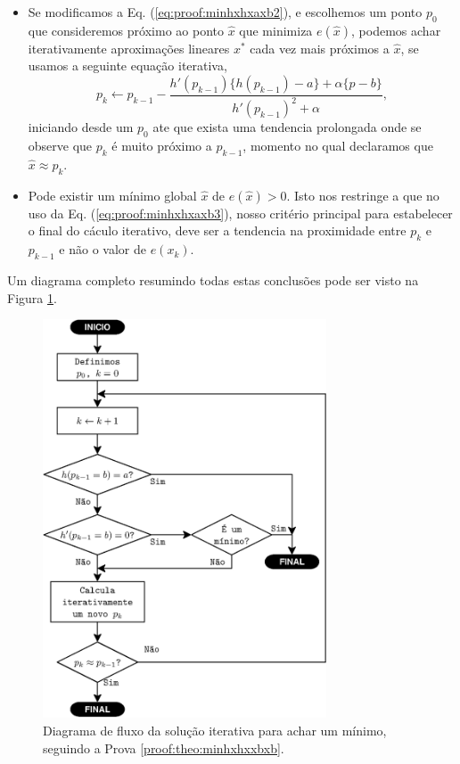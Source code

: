 \begin{myproofT}
\begin{itemize}
\item Se modificamos a Eq. (\ref{eq:proof:minhxhxaxb2}), e escolhemos um ponto  
$p_0$ que consideremos próximo ao ponto $\hat{x}$ que minimiza $e(\hat{x})$,
podemos achar iterativamente aproximações lineares $x^*$ cada vez mais próximos a  $\hat{x}$,
se usamos a seguinte equação iterativa,
\begin{equation}\label{eq:proof:minhxhxaxb3}
p_{k} \leftarrow p_{k-1} - \frac{ h'(p_{k-1})\{h(p_{k-1})-a\}+\alpha\{p-b\}}{h'(p_{k-1})^2+\alpha},
\end{equation}
iniciando desde um $p_{0}$ 
ate que exista uma tendencia prolongada onde se observe que $p_{k}$ é muito próximo a $p_{k-1}$,
momento no qual declaramos que $\hat{x} \approx p_{k}$.
\item Pode existir um mínimo global $\hat{x}$ de $e(\hat{x})>0$.
Isto nos restringe a que no uso da Eq. (\ref{eq:proof:minhxhxaxb3}),
nosso critério principal para estabelecer o final do cáculo iterativo,
deve ser a tendencia na  proximidade entre $p_{k}$ e $p_{k-1}$ 
e não o valor de $e(x_k)$.
\end{itemize}

Um diagrama completo resumindo todas estas conclusões pode ser visto na Figura \ref{fig:fluxohx2}.
\end{myproofT}



\begin{figure}[!h]
     \centering
         \includegraphics[width=0.75\textwidth]{chapters/minimization-hx/fluxo2.eps}
        \caption{Diagrama de fluxo da solução iterativa para achar um mínimo, seguindo a Prova \ref{proof:theo:minhxhxxbxb}.}
        \label{fig:fluxohx2}
\end{figure}


